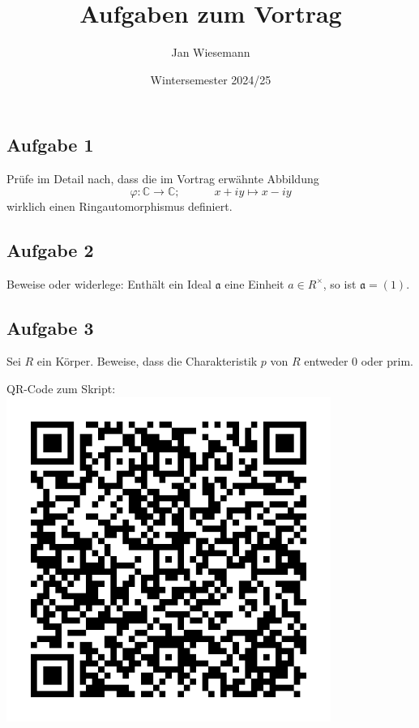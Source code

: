 \documentclass[12pt]{article}
\begin{document}
\title{\bf{Aufgaben zum Vortrag}}
\author{Jan Wiesemann}
\date{Wintersemester 2024/25}
\maketitle

\subsection*{Aufgabe 1}
Prüfe im Detail nach, dass die im Vortrag erwähnte Abbildung
\[\varphi: \mathbb C\to\mathbb C; \hspace{3em} x+iy \longmapsto x-iy\]
wirklich einen Ringautomorphismus definiert.

\subsection*{Aufgabe 2}
Beweise oder widerlege: Enthält ein Ideal $\mathfrak a$ eine Einheit $a\in R^\times$, so ist $\mathfrak a=(1)$.

\subsection*{Aufgabe 3}
Sei $R$ ein Körper. Beweise, dass die Charakteristik $p$ von $R$ entweder 0 oder prim.

\vspace{2.5em}
QR-Code zum Skript:
\vspace{-1em}
\center\includegraphics{qr.pdf}
\end{document}
